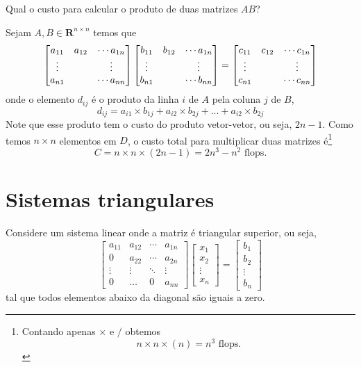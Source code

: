 \begin{ex}
Qual o custo para calcular o produto de duas matrizes  $A B$?
\end{ex}
\begin{sol}
Sejam $A, B \in \mathbf{R}^{n\times n}$ temos que 
\begin{equation}
  \begin{bmatrix} a_{11}&a_{12}&\cdots a_{1n} \\ \vdots&&\vdots \\ a_{n1}&&\cdots a_{nn} \end{bmatrix}
  \begin{bmatrix} b_{11}&b_{12}&\cdots a_{1n} \\ \vdots&&\vdots \\ b_{n1}&&\cdots b_{nn} \end{bmatrix} 
 =\begin{bmatrix} c_{11}&c_{12}&\cdots c_{1n} \\ \vdots&&\vdots \\ c_{n1}&&\cdots c_{nn} \end{bmatrix} 
\end{equation}
onde o elemento $d_{ij}$ é o produto da linha $i$ de $A$ pela coluna $j$ de $B$,
\begin{equation}
  d_{ij}=  a_{i1}\times b_{1j} + a_{i2}\times b_{2j} +...+a_{i2}\times b_{2j}
\end{equation}
Note que esse produto tem o custo do produto vetor-vetor, ou seja, $2n-1$. Como temos $n\times n$ elementos em $D$, o custo total para multiplicar duas matrizes é\footnote{Contando apenas $\times$ e $/$ obtemos
\begin{equation}
  n\times n \times(n)  = n^3 \text{~flops.}
\end{equation}
}
\begin{equation}
  C= n\times n \times (2n-1)= 2n^3-n^2 \text{~flops.}
\end{equation}

\end{sol}


\section{Sistemas triangulares}
Considere um sistema linear onde a matriz é triangular superior, ou seja, 
$$\begin{bmatrix}
a_{11} & a_{12} & \cdots & a_{1n}\\
0      & a_{22} & \cdots & a_{2n}\\
\vdots & \vdots & \ddots & \vdots\\
0      & \dots  & 0     & a_{nn}
\end{bmatrix}
\begin{bmatrix}
x_{1} \\
x_{2} \\
\vdots \\
x_{n}
\end{bmatrix} 
 =\begin{bmatrix}
b_{1} \\
b_{2} \\
\vdots \\
b_{n}
\end{bmatrix}
$$
tal que todos elementos abaixo da diagonal são iguais a zero.

